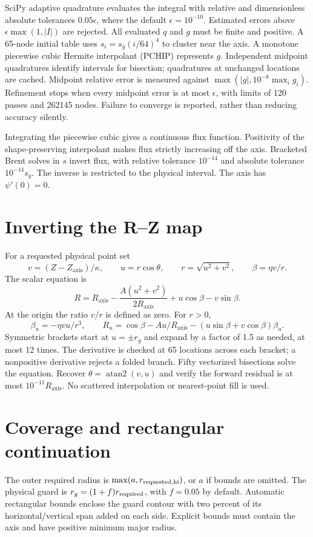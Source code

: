 \documentclass[11pt]{article}
\newcommand{\Ra}{R_{\mathrm{axis}}}
\newcommand{\Za}{Z_{\mathrm{axis}}}
\begin{document}
SciPy adaptive quadrature evaluates the integral with relative and
dimensionless absolute tolerances $0.05\epsilon$, where the default
$\epsilon=10^{-10}$. Estimated errors above
$\epsilon\max(1,|I|)$ are rejected. All evaluated $q$ and $g$ must be finite
and positive. A 65-node initial table uses $s_i=s_g(i/64)^4$ to cluster near
the axis. A monotone piecewise cubic Hermite interpolant (PCHIP) represents
$g$. Independent midpoint quadratures identify intervals for bisection;
quadratures at unchanged locations are cached. Midpoint relative error is
measured against $\max(|g|,10^{-8}\max_i g_i)$. Refinement stops when every
midpoint error is at most $\epsilon$, with limits of 120 passes and 262145
nodes. Failure to converge is reported, rather than reducing accuracy silently.

Integrating the piecewise cubic gives a continuous flux function. Positivity
of the shape-preserving interpolant makes flux strictly increasing off the
axis. Bracketed Brent solves in $s$ invert flux, with relative tolerance
$10^{-14}$ and absolute tolerance $10^{-14}s_g$. The inverse is restricted
to the physical interval. The axis has $\psi'(0)=0$.

\section{Inverting the R--Z map}
For a requested physical point set
\begin{equation}
v=(Z-\Za)/\kappa,\qquad u=r\cos\theta,\qquad
r=\sqrt{u^2+v^2},\qquad \beta=\eta v/r.
\end{equation}
The scalar equation is
\begin{equation}
R=\Ra-\frac{A(u^2+v^2)}{2\Ra}+u\cos\beta-v\sin\beta.
\end{equation}
At the origin the ratio $v/r$ is defined as zero. For $r>0$,
\begin{equation}
\beta_u=-\eta vu/r^3,\qquad
R_u=\cos\beta-Au/\Ra-(u\sin\beta+v\cos\beta)\beta_u.
\end{equation}
Symmetric brackets start at $u=\pm r_g$ and expand by a factor of 1.5 as
needed, at most 12 times. The derivative is checked at 65 locations across
each bracket; a nonpositive derivative rejects a folded branch. Fifty
vectorized bisections solve the equation. Recover $\theta=\operatorname{atan2}(v,u)$
and verify the forward residual is at most $10^{-11}\Ra$.
No scattered interpolation or nearest-point fill is used.

\section{Coverage and rectangular continuation}
The outer required radius is $\max(a,r_{\rm requested,hi})$, or $a$ if bounds
are omitted. The physical guard is $r_g=(1+f)r_{\rm required}$, with $f=0.05$
by default. Automatic rectangular bounds enclose the guard contour with
two percent of its horizontal/vertical span added on each side. Explicit
bounds must contain the axis and have positive minimum major radius.
\end{document}
